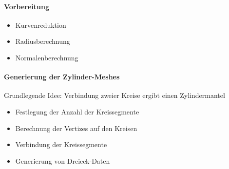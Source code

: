 \paragraph{Vorbereitung\\ }
\begin{itemize}
	\item Kurvenreduktion
	\item Radiusberechnung
	\item Normalenberechnung
\end{itemize}





\newpage
{}
\paragraph{Generierung der Zylinder-Meshes\\}


\begin{description}
	\item Grundlegende Idee: Verbindung zweier Kreise ergibt einen Zylindermantel
 
	\begin{itemize}
		\item Festlegung der Anzahl der Kreissegmente\\
		
		\item Berechnung der Vertizes auf den Kreisen\\
		
		\item Verbindung der Kreissegmente\\
		
		\item Generierung von Dreieck-Daten
	\end{itemize}
\end{description}




